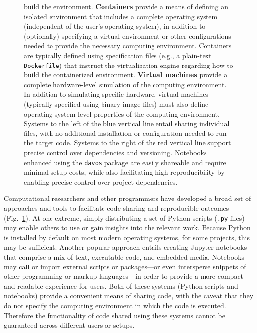 \documentclass[preprint,12pt,a4paper]{elsarticle}
\begin{document}
\begin{figure}[tp]
{  build the environment.  \textbf{Containers} provide a means of
  defining an isolated environment that includes a complete operating
  system (independent of the user's operating system), in addition to
  (optionally) specifying a virtual environment or other
  configurations needed to provide the necessary computing
  environment.  Containers are typically defined using specification
  files (e.g., a plain-text \texttt{Dockerfile}) that instruct the
  virtualization engine regarding how to build the containerized
  environment.  \textbf{Virtual machines} provide a complete
  hardware-level simulation of the computing environment.  In addition
  to simulating specific hardware, virtual machines (typically
  specified using binary image files) must also define operating
  system-level properties of the computing environment.  Systems to
  the left of the blue vertical line entail sharing individual files,
  with no additional installation or configuration needed to run the
  target code.  Systems to the right of the red vertical line support
  precise control over dependencies and versioning.  Notebooks
  enhanced using the \texttt{davos} package are easily shareable and
  require minimal setup costs, while also facilitating high
  reproducibility by enabling precise control over project
  dependencies.}
\label{fig:code-sharing}
\end{figure}

Computational researchers and other programmers have de\-vel\-oped a
broad set of approaches and tools to facilitate code sharing and
reproducible outcomes (Fig.~\ref{fig:code-sharing}). At one extreme,
simply distributing a set of Python scripts (\texttt{.py} files) may
enable others to use or gain insights into the relevant work. Because
Python is installed by default on most modern operating systems, for
some projects, this may be sufficient. Another popular approach
entails creating Jupyter notebooks~\cite{KluyEtal16} that comprise a
mix of text, executable code, and embedded media. Notebooks may call
or import external scripts or packages---or even intersperse snippets
of other programming or markup lang\-uages---in order to provide a
more compact and readable experience for users. Both of these systems
(Python scripts and notebooks) provide a convenient means of sharing
code, with the caveat that they do not specify the computing
environment in which the code is executed. Therefore the functionality
of code shared using these systems cannot be guaranteed across
different users or setups.
\end{document}
